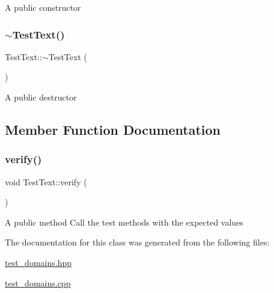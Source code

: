 A public constructor \mbox{\label{class_test_text_a6c7fc1f46cab52437b3d77cd7d593d40}} 
\subsubsection{\texorpdfstring{$\sim$\+Test\+Text()}{~TestText()}}
{\footnotesize\ttfamily Test\+Text\+::$\sim$\+Test\+Text (\begin{DoxyParamCaption}{ }\end{DoxyParamCaption})}

A public destructor 

\subsection{Member Function Documentation}
\mbox{\label{class_test_text_a31dc2a3f90d77c2db5c0278e7233f3b0}} 
\subsubsection{\texorpdfstring{verify()}{verify()}}
{\footnotesize\ttfamily void Test\+Text\+::verify (\begin{DoxyParamCaption}{ }\end{DoxyParamCaption})}

A public method Call the test methods with the expected values 

The documentation for this class was generated from the following files\+:\begin{DoxyCompactItemize}
\item 
\hyperlink{test__domains_8hpp}{test\+\_\+domains.\+hpp}\item 
\hyperlink{test__domains_8cpp}{test\+\_\+domains.\+cpp}\end{DoxyCompactItemize}

